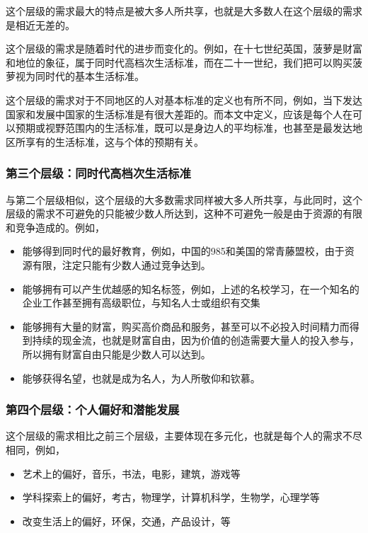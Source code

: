 这个层级的需求最大的特点是被大多人所共享，也就是大多数人在这个层级的需求是相近无差的。

这个层级的需求是随着时代的进步而变化的。例如，在十七世纪英国，菠萝是财富和地位的象征，属于同时代高档次生活标准，而在二十一世纪，我们把可以购买菠萝视为同时代的基本生活标准。

这个层级的需求对于不同地区的人对基本标准的定义也有所不同，例如，当下发达国家和发展中国家的生活标准是有很大差距的。而本文中定义，应该是每个人在可以预期或视野范围内的生活标准，既可以是身边人的平均标准，也甚至是最发达地区所享有的生活标准，这与个体的预期有关。

\clearpage

\subsubsection*{第三个层级：同时代高档次生活标准}

与第二个层级相似，这个层级的大多数需求同样被大多人所共享，与此同时，这个层级的需求不可避免的只能被少数人所达到，这种不可避免一般是由于资源的有限和竞争造成的。例如，

\begin{itemize}
    \item 能够得到同时代的最好教育，例如，中国的985和美国的常青藤盟校，由于资源有限，注定只能有少数人通过竞争达到。
    \item 能够拥有可以产生优越感的知名标签，例如，上述的名校学习，在一个知名的企业工作甚至拥有高级职位，与知名人士或组织有交集
    \item 能够拥有大量的财富，购买高价商品和服务，甚至可以不必投入时间精力而得到持续的现金流，也就是财富自由，因为价值的创造需要大量人的投入参与，所以拥有财富自由只能是少数人可以达到。
    \item 能够获得名望，也就是成为名人，为人所敬仰和钦慕。
\end{itemize}

\subsubsection*{第四个层级：个人偏好和潜能发展}

这个层级的需求相比之前三个层级，主要体现在多元化，也就是每个人的需求不尽相同，例如，

\begin{itemize}
    \item 艺术上的偏好，音乐，书法，电影，建筑，游戏等
    \item 学科探索上的偏好，考古，物理学，计算机科学，生物学，心理学等
    \item 改变生活上的偏好，环保，交通，产品设计，等
\end{itemize}

